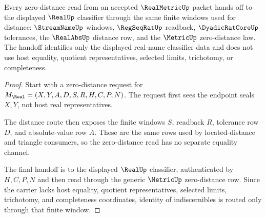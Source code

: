 \begin{theorem}
\label{thm:real-metric-identity-of-indiscernibles-window}
Every zero-distance read from an accepted $\RealMetricUp$ packet hands off to the displayed $\RealUp$ classifier through the same finite windows used for distance: $\StreamNameUp$ windows, $\RegSeqRatUp$ readback, $\DyadicRatCoreUp$ tolerances, the $\RealAbsUp$ distance row, and the $\MetricUp$ zero-distance law. The handoff identifies only the displayed real-name classifier data and does not use host equality, quotient representatives, selected limits, trichotomy, or completeness.
\end{theorem}
\begin{proof}
Start with a zero-distance request for $M_{\Real}=(X,Y,A,D,S,R,H,C,P,N)$. The request first sees the endpoint seals $X,Y$, not host real representatives.

The distance route then exposes the finite windows $S$, readback $R$, tolerance row $D$, and absolute-value row $A$. These are the same rows used by located-distance and triangle consumers, so the zero-distance read has no separate equality channel.

The final handoff is to the displayed $\RealUp$ classifier, authenticated by $H,C,P,N$ and then read through the generic $\MetricUp$ zero-distance row. Since the carrier lacks host equality, quotient representatives, selected limits, trichotomy, and completeness coordinates, identity of indiscernibles is routed only through that finite window.
\end{proof}


